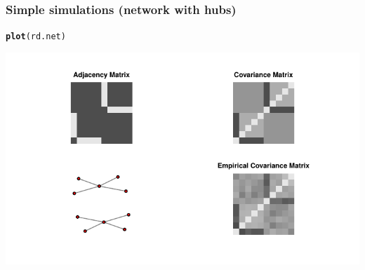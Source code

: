 \documentclass[10pt, c, xcolor=x11names]{beamer}\usepackage[]{graphicx}\usepackage[]{color}
\makeatletter
\newcommand{\hlstd}[1]{\textcolor[rgb]{0.345,0.345,0.345}{#1}}%
\newcommand{\hlkwd}[1]{\textcolor[rgb]{0.737,0.353,0.396}{\textbf{#1}}}%
\newenvironment{kframe}{%
 \def\at@end@of@kframe{}%
 \ifinner\ifhmode%
  \def\at@end@of@kframe{\end{minipage}}%
  \begin{minipage}{\columnwidth}%
 \fi\fi%
 \def\FrameCommand##1{\hskip\@totalleftmargin \hskip-\fboxsep
 \colorbox{shadecolor}{##1}\hskip-\fboxsep
     \hskip-\linewidth \hskip-\@totalleftmargin \hskip\columnwidth}%
 \MakeFramed {\advance\hsize-\width
   \@totalleftmargin\z@ \linewidth\hsize
   \@setminipage}}%
 {\par\unskip\endMakeFramed%
 \at@end@of@kframe}
\newenvironment{knitrout}{}{} %
\makeatother
\begin{document}
\begin{frame}[fragile]
  \frametitle{Simple simulations (network with hubs)}



\begin{knitrout}\scriptsize
{}\color{fgcolor}\begin{kframe}
\begin{alltt}
\hlkwd{plot}\hlstd{(rd.net)}
\end{alltt}
\end{kframe}
\includegraphics[width=.8\textwidth]{figures/r_simu_hub_plot-1} 

\end{knitrout}

\end{frame}
\end{document}
